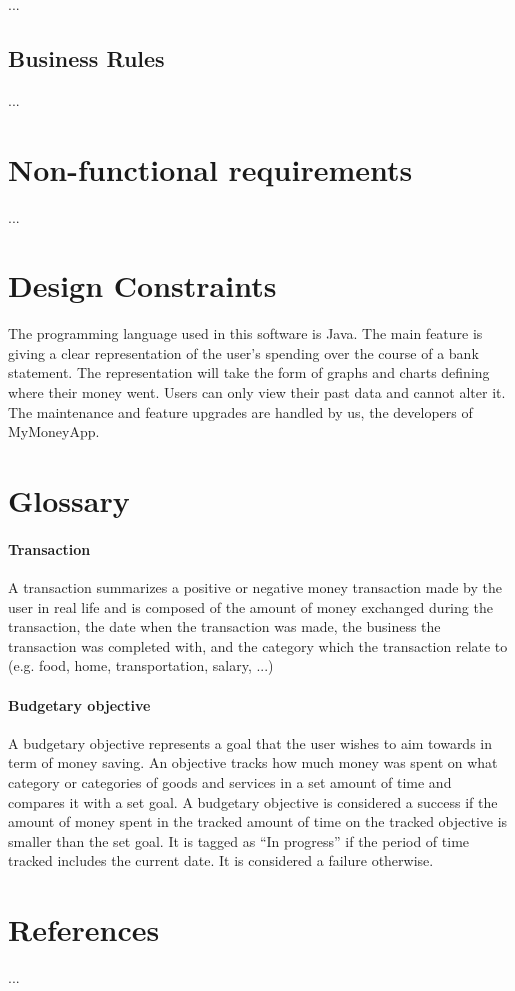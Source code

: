 \documentclass[letterpaper]{article}
\begin{document}
			...
	
	\subsection{Business Rules}
	
		...
		
\section{Non-functional requirements}

	...

\section{Design Constraints}

	The programming language used in this software is Java. The main feature is giving a clear representation of the user’s spending over the course of a bank statement. The representation will take the form of graphs and charts defining where their money went. Users can only view their past data and cannot alter it. The maintenance and feature upgrades are handled by us, the developers of MyMoneyApp.

\section{Glossary}

	\paragraph{Transaction}
	
		A transaction summarizes a positive or negative money transaction made by the user in real life and is composed of the amount of money exchanged during the transaction, the date when the transaction was made, the business the transaction was completed with, and the category which the transaction relate to (e.g. food, home, transportation, salary, ...)
	
	\paragraph{Budgetary objective}
	
		A budgetary objective represents a goal that the user wishes to aim towards in term of money saving. An objective tracks how much money was spent on what category or categories of goods and services in a set amount of time and compares it with a set goal. A budgetary objective is considered a success if the amount of money spent in the tracked amount of time on the tracked objective is smaller than the set goal. It is tagged as “In progress” if the period of time tracked includes the current date. It is considered a failure otherwise.

\section{References}

	...
	
\end{document}
